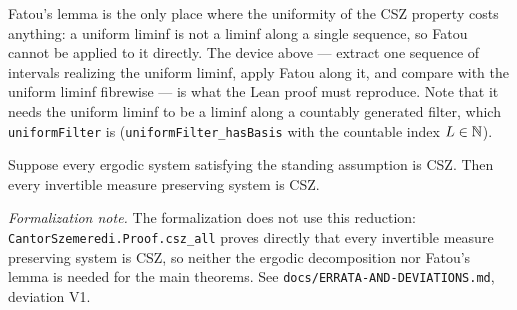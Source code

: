 \begin{remark}
  Fatou's lemma is the only place where the uniformity of the CSZ property costs anything: a
  uniform liminf is not a liminf along a single sequence, so Fatou cannot be applied to it
  directly.  The device above --- extract one sequence of intervals realizing the uniform
  liminf, apply Fatou along it, and compare with the uniform liminf fibrewise --- is what the
  Lean proof must reproduce.  Note that it needs the uniform liminf to be a liminf along a
  countably generated filter, which \texttt{uniformFilter} is (\texttt{uniformFilter\_hasBasis}
  with the countable index $L \in \mathbb{N}$).
\end{remark}

\begin{proposition}
  \label{prop:reduction}
  \leanok
  Suppose every ergodic system satisfying the standing assumption is CSZ.  Then every invertible
  measure preserving system is CSZ.
\end{proposition}
\emph{Formalization note.}  The formalization does not use this reduction:
\texttt{CantorSzemeredi.Proof.csz\_all} proves directly that every invertible measure preserving
system is CSZ, so neither the ergodic decomposition nor Fatou's lemma is needed for the main
theorems.  See \texttt{docs/ERRATA-AND-DEVIATIONS.md}, deviation V1.


